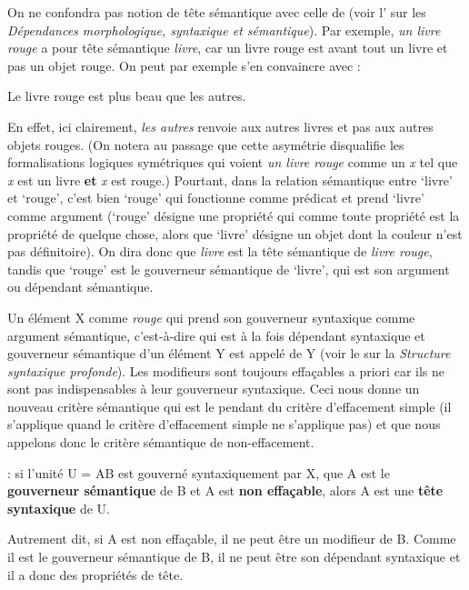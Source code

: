 On ne confondra pas notion de tête sémantique avec celle de  (voir l’ sur les \textit{Dépendances morphologique, syntaxique et sémantique}). Par exemple, \textit{un livre rouge} a pour tête sémantique \textit{livre}, car un livre rouge est avant tout un livre et pas un objet rouge. On peut par exemple s’en convaincre avec :

\ea
    {Le livre rouge est plus beau que les autres.}
\z

En effet, ici clairement, \textit{les autres} renvoie aux autres livres et pas aux autres objets rouges. (On notera au passage que cette asymétrie disqualifie les formalisations logiques symétriques qui voient \textit{un livre rouge} comme un \textit{x} tel que \textit{x} est un livre \textbf{et} \textit{x} est rouge.) Pourtant, dans la relation sémantique entre ‘livre’ et ‘rouge’, c’est bien ‘rouge’ qui fonctionne comme prédicat et prend ‘livre’ comme argument (‘rouge’ désigne une propriété qui comme toute propriété est la propriété de quelque chose, alors que ‘livre’ désigne un objet dont la couleur n’est pas définitoire). On dira donc que \textit{livre} est la tête sémantique de \textit{livre rouge}, tandis que ‘rouge’ est le gouverneur sémantique de ‘livre’, qui est son argument ou dépendant sémantique.

Un élément X comme \textit{rouge} qui prend son gouverneur syntaxique comme argument sémantique, c’est-à-dire qui est à la fois dépendant syntaxique et gouverneur sémantique d’un élément Y est appelé  de Y (voir le  sur la \textit{Structure syntaxique profonde}). Les modifieurs sont toujours effaçables a priori car ils ne sont pas indispensables à leur gouverneur syntaxique. Ceci nous donne un nouveau critère sémantique qui est le pendant du critère d’effacement simple (il s’applique quand le critère d’effacement simple ne s’applique pas) et que nous appelons donc le critère sémantique de non-effacement.

{: si l’unité U = AB est gouverné syntaxiquement par X, que A est le \textbf{gouverneur sémantique} de B et A est \textbf{non effaçable}, alors A est une \textbf{tête syntaxique} de U.}

Autrement dit, si A est non effaçable, il ne peut être un modifieur de B. Comme il est le gouverneur sémantique de B, il ne peut être son dépendant syntaxique et il a donc des propriétés de tête.


